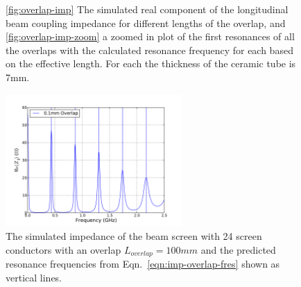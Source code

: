 \begin{figure}
\caption{\ref{fig:overlap-imp} The simulated real component of the longitudinal beam coupling impedance for different lengths of the overlap, and \ref{fig:overlap-imp-zoom} a zoomed in plot of the first resonances of all the overlaps with the calculated resonance frequency for each based on the effective length. For each the thickness of the ceramic tube is 7mm.}
\label{fig:mki-overlap-imp-tot}
\end{figure}

\begin{figure}
\begin{center}
\includegraphics[width=0.6\textwidth]{LHC_MKI/figures/mki-overlap-fres-100mm.pdf}
\end{center}
\caption{The simulated impedance of the beam screen with 24 screen conductors with an overlap $L_{overlap}=100mm$ and the predicted resonance frequencies from Eqn.~\ref{eqn:imp-overlap-fres} shown as vertical lines.}
\label{fig:imp-overlap-fres}
\end{figure}

